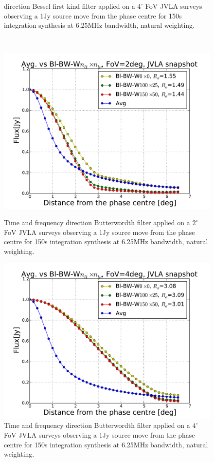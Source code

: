 \documentclass[useAMS,usenatbib]{mn2e}
\begin{document}
\begin{figure}
\begin{minipage}{0.36\linewidth}
{direction Bessel first kind filter applied on a $4^{\circ}$ FoV JVLA surveys observing a 1Jy source move from the phase centre for 150s 
integration synthesis at 6.25MHz bandwidth, natural weighting.}\label{fig:Bl-bessel-FoV4}\end{minipage}\\
\begin{minipage}{0.36\linewidth}\includegraphics[width=1\textwidth]{./Figures/Bl-butter-FoV2-vla.pdf}\caption{Time and frequency 
direction Butterwordth filter applied on a $2^{\circ}$ FoV JVLA surveys observing a 1Jy source move from the phase centre for 
150s integration synthesis at 6.25MHz bandwidth, natural weighting.}\label{fig:Bl-butter-FoV2}\end{minipage}
\hspace{1cm}
\begin{minipage}{0.36\linewidth}\includegraphics[width=1\textwidth]{./Figures/Bl-butter-FoV4-vla.pdf}\caption{Time and frequency 
direction Butterwordth filter applied on a $4^{\circ}$ FoV JVLA surveys observing a 1Jy source move from the phase centre for 150s 
integration synthesis at 6.25MHz bandwidth, natural weighting.}\label{fig:Bl-butter-FoV4}\end{minipage}
\end{figure}
\end{document}
